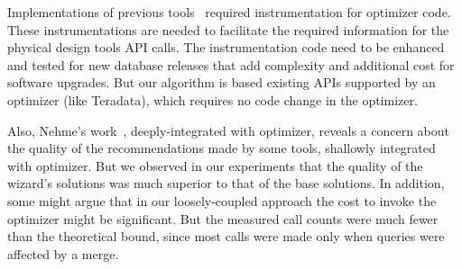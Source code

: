 \documentclass[runningheads]{comsis2}
\begin{document}
Implementations of previous tools~\cite{agrawal04:integrating,Lightstone04:db2auto,nehme2011automated} \hbox{required} instrumentation for optimizer code.
These instrumentations are needed to facilitate the required 
information for the physical design tools API calls. 
The \hbox{instrumentation} code need to be enhanced and tested for new database 
releases that add complexity and additional cost for software upgrades. 
But our algorithm is based existing APIs supported by an optimizer (like Teradata), 
which requires no code change in the optimizer.

Also, Nehme's work~\cite{nehme2011automated}, deeply-integrated with 
optimizer, reveals a concern about the quality of the recommendations 
made by some tools, shallowly integrated with optimizer. 
But we observed in our experiments that the quality of 
the wizard's solutions was much superior to that of the base solutions. 
In addition, some might argue that in our loosely-coupled approach 
the cost to invoke the optimizer might be significant. 
But the measured call counts were much fewer than 
the theoretical bound, since most calls were made only when queries were affected by a merge.  

\end{document}
